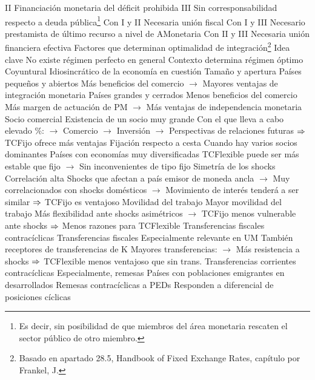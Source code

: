 \documentclass{nuevotema}
\begin{document}
\begin{esquemal}
				\4[] \textsc{II} Financiación monetaria del déficit prohibida
				\4[] \textsc{III} Sin corresponsabilidad respecto a deuda pública\footnote{Es decir, sin posibilidad de que miembros del área monetaria rescaten el sector público de otro miembro.}
				\4 Con I y II
				\4[] Necesaria unión fiscal
				\4 Con I y III
				\4[] Necesario prestamista de último recurso a nivel de AMonetaria
				\4 Con II y III
				\4[] Necesaria unión financiera efectiva
		\2 Factores que determinan optimalidad de integración\footnote{Basado en apartado 28.5, Handbook of Fixed Exchange Rates, capítulo por Frankel, J.}
			\3 Idea clave
				\4 No existe régimen perfecto en general
				\4 Contexto determina régimen óptimo
				\4[] Coyuntural
				\4[] Idiosincrático de la economía en cuestión
			\3[\textsc{i}] Tamaño y apertura
				\4 Países pequeños y abiertos
				\4[] Más beneficios del comercio
				\4[] $\to$ Mayores ventajas de integración monetaria
				\4 Países grandes y cerrados
				\4[] Menos beneficios del comercio
				\4[] Más margen de actuación de PM
				\4[] $\to$ Más ventajas de independencia monetaria
			\3[\textsc{ii}] Socio comercial
				\4 Existencia de un socio muy grande
				\4[] Con el que lleva a cabo elevado \%:
				\4[] $\to$ Comercio
				\4[] $\to$ Inversión
				\4[] $\to$ Perspectivas de relaciones futuras
				\4[] $\Rightarrow$ TCFijo ofrece más ventajas
				\4 Fijación respecto a cesta
				\4[] Cuando hay varios socios dominantes
				\4 Países con economías muy diversificadas
				\4[] TCFlexible puede ser más estable que fijo
				\4[] $\to$ Sin inconvenientes de tipo fijo
			 Simetría de los shocks
				\4 Correlación alta
				\4[] Shocks que afectan a país emisor de moneda ancla
				\4[] $\to$ Muy correlacionados con shocks domésticos
				\4[] $\to$ Movimiento de interés tenderá a ser similar
				\4[] $\Rightarrow$ TCFijo es ventajoso
			\3[\textsc{iv}] Movilidad del trabajo
				\4 Mayor movilidad del trabajo
				\4[] Más flexibilidad ante shocks asimétricos
				\4[] $\to$ TCFijo menos vulnerable ante shocks
				\4[] $\Rightarrow$ Menos razones para TCFlexible
			\3[\textsc{v}] Transferencias fiscales contracíclicas
				\4 Transferencias fiscales
				\4[] Especialmente relevante en UM
				\4[] También receptores de transferencias de K
				\4[] Mayores transferencias:
				\4[] $\to$ Más resistencia a shocks
				\4[] $\Rightarrow$ TCFlexible menos ventajoso que sin trans.
			\3[\textsc{vi}] Transferencias corrientes contracíclicas
				\4 Especialmente, remesas
				\4 Países con poblaciones emigrantes en desarrollados
				\4[] Remesas contracíclicas a PEDs
				\4[] Responden a diferencial de posiciones cíclicas

\end{esquemal}
\end{document}
